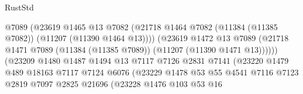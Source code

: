 \begin{lexlean}{RustStd}
\begin{coremodule}
                                          @7089
                                          (@23619
                                            @1465
                                            @13
                                            @7082
                                            (@21718
                                              @1464
                                              @7082
                                              (@11384 (@11385 @7082))
                                              (@11207 (@11390 @1464 @13))))
                                          (@23619
                                            @1472
                                            @13
                                            @7089
                                            (@21718
                                              @1471
                                              @7089
                                              (@11384 (@11385 @7089))
                                              (@11207 (@11390 @1471 @13))))))
                                      (@23209
                                        @1480
                                        @1487
                                        @1494
                                        @13
                                        @7117
                                        @7126
                                        @2831
                                        @7141
                                        (@23220
                                          @1479
                                          @489
                                          @18163
                                          @7117
                                          @7124
                                          @6076
                                          (@23229
                                            @1478
                                            @53
                                            @55
                                            @4541
                                            @7116
                                            @7123
                                            @2819
                                            @7097
                                            @2825
                                            @21696
                                            (@23228
                                              @1476
                                              @103
                                              @53
                                              @16

\end{coremodule}
\end{lexlean}

